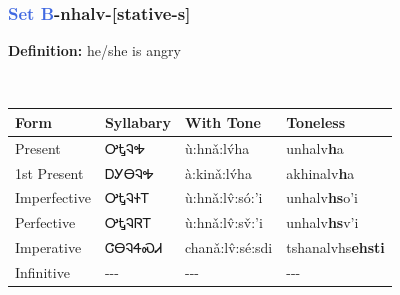 \subsubsection*{\textcolor{RoyalBlue}{Set B}{-}\textbf{nhalv}{-}[stative-s]}
\nopagebreak
\textbf{Definition: } he/she is angry
\\[0.5em]
\begin{tabularx}{\textwidth}{l X X X}%
\toprule%
\textbf{Form}&\textbf{Syllabary}&\textbf{With Tone}&\textbf{Toneless}\\%
\midrule%
Present&ᎤᎿᎸᎭ&ù:hnǎ:lv́ha&unhalv\textbf{h}a\\%
1st Present&ᎠᎩᎾᎸᎭ&à:kinǎ:lv́ha&akhinalv\textbf{h}a\\%
Imperfective&ᎤᎿᎸᏐᎢ&ù:hnǎ:lv̂:só:’i&unhalv\textbf{hs}o'i\\%
Perfective&ᎤᎿᎸᏒᎢ&ù:hnǎ:lv̂:sv̌:’i&unhalv\textbf{hs}v'i\\%
Imperative&ᏣᎾᎸᏎᏍᏗ&chanǎ:lv̂:sé:sdi&tshanalvhs\textbf{ehsti}\\%
Infinitive&{-}{-}{-}&{-}{-}{-}&{-}{-}{-}\\%
\bottomrule%
\end{tabularx}
\\[1em]